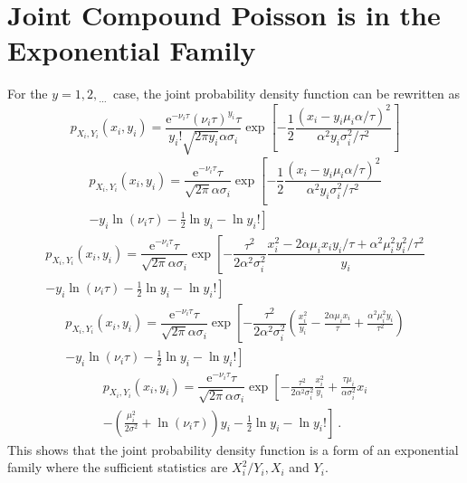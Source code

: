\documentclass[12pt]{report}
\newcommand{\euler}{\mathrm{e}}
\newcommand{\dotdotdot}{_{\phantom{.}\cdots}}
\begin{document}
\section{Joint Compound Poisson is in the Exponential Family} \label{chapter:compoundPoisson_expFamily}
For the $y=1,2,\dotdotdot$ case, the joint probability density function can be rewritten as
\begin{equation*}
p_{X_i,Y_i}\left(x_i,y_i\right)=\dfrac{\euler^{-\nu_i\tau}(\nu_i\tau)^{y_i}\tau}{y_i!\sqrt{2\pi y_i}\alpha\sigma_i}
\exp\left[-\dfrac{1}{2}\dfrac{\left(x_i-y_i\mu_i\alpha/\tau\right)^2}{\alpha^2y_i\sigma_i^2/\tau^2}\right]
\end{equation*}
\begin{multline*}
p_{X_i,Y_i}\left(x_i,y_i\right)=\dfrac{\euler^{-\nu_i\tau}\tau}{\sqrt{2\pi}\alpha\sigma_i}
\exp\left[-\dfrac{1}{2}\dfrac{\left(x_i-y_i\mu_i\alpha/\tau\right)^2}{\alpha^2y_i\sigma_i^2/\tau^2}
\right.
\\
\left.
-y_i\ln(\nu_i\tau) -\frac{1}{2}\ln{y_i} - \ln{y_i!}\right]
\end{multline*}
\begin{multline*}
p_{X_i,Y_i}\left(x_i,y_i\right)=\dfrac{\euler^{-\nu_i\tau}\tau}{\sqrt{2\pi}\alpha\sigma_i}
\exp\left[-\dfrac{\tau^2}{2\alpha^2\sigma_i^2}\dfrac{x_i^2-2\alpha\mu_ix_iy_i/\tau+\alpha^2\mu_i^2y_i^2/\tau^2}{y_i}
\right.
\\
\left.
-y_i\ln(\nu_i\tau) -\frac{1}{2}\ln{y_i} - \ln{y_i!}\right]
\end{multline*}
\begin{multline*}
p_{X_i,Y_i}\left(x_i,y_i\right)=\dfrac{\euler^{-\nu_i\tau}\tau}{\sqrt{2\pi}\alpha\sigma_i}
\exp\left[-\dfrac{\tau^2}{2\alpha^2\sigma_i^2}\left(\frac{x_i^2}{y_i}-\frac{2\alpha\mu_ix_i}{\tau}+\frac{\alpha^2\mu_i^2y_i}{\tau^2}\right)
\right.
\\
\left.
-y_i\ln(\nu_i\tau) -\frac{1}{2}\ln{y_i} - \ln{y_i!}\right]
\end{multline*}
\begin{multline*}
p_{X_i,Y_i}\left(x_i,y_i\right)=\dfrac{\euler^{-\nu_i\tau}\tau}{\sqrt{2\pi}\alpha\sigma_i}
\exp\left[
-\frac{\tau^2}{2\alpha^2\sigma_i^2}\frac{x_i^2}{y_i}
+\frac{\tau\mu_i}{\alpha\sigma_i^2}x_i
\right.
\\
\left.
-\left(\frac{\mu_i^2}{2\sigma^2}+\ln(\nu_i\tau)\right)y_i
-\frac{1}{2}\ln{y_i}
-\ln{y_i!}
\right] \ .
\end{multline*}
This shows that the joint probability density function is a form of an exponential family where the sufficient statistics are $X_i^2/Y_i,X_i$ and $Y_i$.
\end{document}
